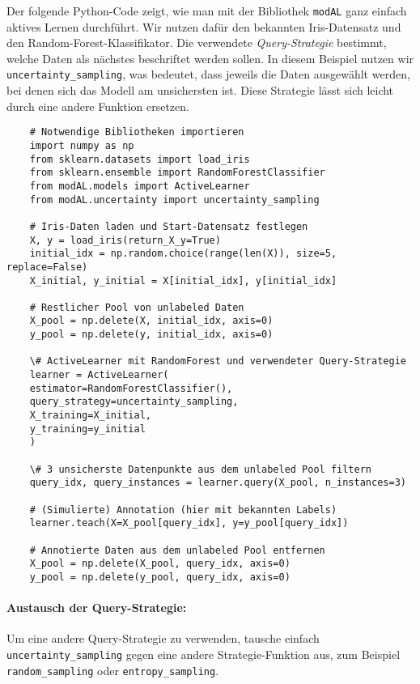\documentclass{article}
\begin{document}
Der folgende Python-Code zeigt, wie man mit der Bibliothek \texttt{modAL} \cite{Danka2018} ganz einfach aktives Lernen durchführt. Wir nutzen dafür den bekannten Iris-Datensatz und den Random-Forest-Klassifikator. Die verwendete \emph{Query-Strategie} bestimmt, welche Daten als nächstes beschriftet werden sollen. In diesem Beispiel nutzen wir \texttt{uncertainty\_sampling}, was bedeutet, dass jeweils die Daten ausgewählt werden, bei denen sich das Modell am unsichersten ist. Diese Strategie lässt sich leicht durch eine andere Funktion ersetzen.

\begin{lstlisting}
	# Notwendige Bibliotheken importieren
	import numpy as np
	from sklearn.datasets import load_iris
	from sklearn.ensemble import RandomForestClassifier
	from modAL.models import ActiveLearner
	from modAL.uncertainty import uncertainty_sampling
	
	# Iris-Daten laden und Start-Datensatz festlegen
	X, y = load_iris(return_X_y=True)
	initial_idx = np.random.choice(range(len(X)), size=5, replace=False)
	X_initial, y_initial = X[initial_idx], y[initial_idx]
	
	# Restlicher Pool von unlabeled Daten
	X_pool = np.delete(X, initial_idx, axis=0)
	y_pool = np.delete(y, initial_idx, axis=0)
	
	\# ActiveLearner mit RandomForest und verwendeter Query-Strategie
	learner = ActiveLearner(
	estimator=RandomForestClassifier(),
	query_strategy=uncertainty_sampling,
	X_training=X_initial,
	y_training=y_initial
	)
	
	\# 3 unsicherste Datenpunkte aus dem unlabeled Pool filtern
	query_idx, query_instances = learner.query(X_pool, n_instances=3)
	
	# (Simulierte) Annotation (hier mit bekannten Labels)
	learner.teach(X=X_pool[query_idx], y=y_pool[query_idx])
	
	# Annotierte Daten aus dem unlabeled Pool entfernen
	X_pool = np.delete(X_pool, query_idx, axis=0)
	y_pool = np.delete(y_pool, query_idx, axis=0)
\end{lstlisting}

\paragraph{Austausch der Query-Strategie:}
Um eine andere Query-Strategie zu verwenden, tausche einfach \texttt{uncertainty\_sampling} gegen eine andere Strategie-Funktion aus, zum Beispiel \texttt{random\_sampling} oder \texttt{entropy\_sampling}.


	
	
	
	
	\printbibliography
\end{document}
